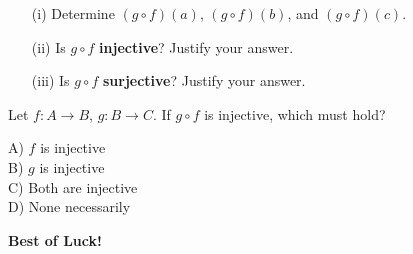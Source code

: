 \documentclass[12pt,letterpaper, onecolumn]{exam}
\begin{document}
\begin{questions}
\begin{enumerate}
    \item[(i)] Determine \((g\circ f)(a)\), \((g\circ f)(b)\), and \((g\circ f)(c)\).
    \item[(ii)] Is \(g\circ f\) \textbf{injective}? Justify your answer.
    \item[(iii)] Is \(g\circ f\) \textbf{surjective}? Justify your answer.
\end{enumerate}
\droppoints
\answerspace[2cm]

\question[5 Marks]
Let \(f:A\to B\), \(g:B\to C\).  
If \(g\circ f\) is injective, which must hold?
\begin{multicols}{2}
A) \(f\) is injective\\
B) \(g\) is injective\\
C) Both are injective\\
D) None necessarily
\end{multicols}
\droppoints
\answerspace[1.5cm]

\end{questions}



    \vfill
\begin{center}
    \large\textbf{Best of Luck!}
\end{center}
\end{document}

